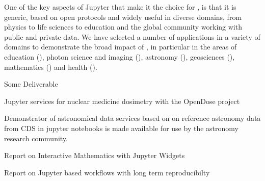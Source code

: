 \begin{workpackage}
\begin{wpdescription}
  One of the key aspects of Jupyter that make it the choice for
  \TheProject, is that it is generic, based on open protocols and
  widely useful in diverse domains, from physics to life sciences to
  education and the global community working with public and private
  data. We have selected a number of applications in a variety of domains
  to demonstrate the broad impact of \TheProject, in particular in the
  areas of education (), photon science and
  imaging (), astronomy
  (), geosciences (),
  mathematics () and health ().

\end{wpdescription}

\begin{tasklist}
% 






\end{tasklist}



\begin{wpdelivs}
\begin{wpdeliv}[due=1,miles=startup,id=infrastructure,dissem=PU,nature=DEC,lead=SRL]
  {Some Deliverable}
\end{wpdeliv}
\begin{wpdeliv}[due=1,miles=startup,id=opendose-analysis,dissem=PU,nature=DEM,lead=INSERM]
  {Jupyter services for nuclear medicine dosimetry with the OpenDose project}
\end{wpdeliv}
\begin{wpdeliv}[due=40,miles=final,id=application-astro,dissem=PU,nature=DEM,lead=CDS]
    {Demonstrator of astronomical data services based on on reference astronomy data from CDS in jupyter notebooks is made available for use by the astronomy research community.}
\end{wpdeliv}
\begin{wpdeliv}[due=36,miles=final,id=math,dissem=PU,nature=R,lead=UPSUD]
  {Report on Interactive Mathematics with Jupyter Widgets}
\end{wpdeliv}
\begin{wpdeliv}[due=48,miles=final,id=xfel-workflows,dissem=PU,nature=R,lead=XFEL]
  {Report on Jupyter based workflows with long term reproducibilty}
\end{wpdeliv}

\end{wpdelivs}
\end{workpackage}

